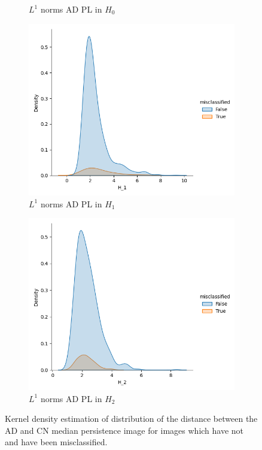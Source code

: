 \documentclass{article}
\begin{document}
\begin{figure}[htb]
\begin{subfigure}{0.32\textwidth}
    \caption{$L^1$ norms AD PL in $H_0$}
  \end{subfigure}
  \begin{subfigure}{0.32\textwidth}
    \includegraphics[width=\textwidth]{figures/misclassification_distance/distribution_distance_misclassified_AD_H_1.png}
    \caption{$L^1$ norms AD PL in $H_1$}
  \end{subfigure}
  \begin{subfigure}{0.32\textwidth}
    \includegraphics[width=\textwidth]{figures/misclassification_distance/distribution_distance_misclassified_AD_H_2.png}
    \caption{$L^1$ norms AD PL in $H_2$}
  \end{subfigure}
    \caption{Kernel density estimation of distribution of the distance between the AD and CN median
      persistence image for images which have not and have been misclassified.}
  \label{fig:outlier_misclassified}
\end{figure}
\end{document}
